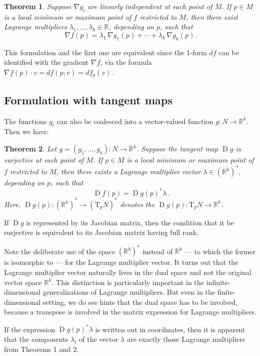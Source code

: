 \documentclass[12pt]{article}
\newcommand{\real}{\mathbb{R}}
\DeclareMathOperator{\D}{D}
\newcommand{\Tp}{\mathrm{T}_p}
\newtheorem{thm}{Theorem}
\begin{document}
\begin{thm}
Suppose $\nabla g_i$ are linearly independent 
at each point of $M$.
If $p \in M$ is a local minimum or maximum point of $f$ restricted to $M$,
then there exist Lagrange multipliers
 $\lambda_1, \dotsc, \lambda_k \in \real$, depending on $p$,
such that
\[
\nabla f(p) = \lambda_1 \, \nabla g_1(p) + \dotsb + \lambda_k \, \nabla g_k(p)\,.
\]
\end{thm}

This formulation and the first one 
are equivalent since
the 1-form $df$ can be identified with the gradient
$\nabla f$, via the formula $\nabla f(p) \cdot v = d f(p;v) = df_p(v)$.


\subsection{Formulation with tangent maps}

The functions $g_i$ can also be coalesced into a vector-valued function 
$g\colon N \to \real^k$.  Then we have:

\begin{thm}
Let $g = (g_1, \dotsc, g_k) \colon N \to \real^k$.
Suppose the tangent map $\D g $ is surjective
at each point of $M$.
If $p \in M$ is a local minimum or maximum point of $f$ restricted to $M$,
then 
there exists a Lagrange multiplier vector $\lambda \in (\real^k)^*$,
depending on $p$, such that
\[
\D f(p) = \D g(p)^* \lambda\,.
\]
Here, $\D g(p)\colon (\real^k)^* \to (\Tp N)^*$ 
denotes the  $\D g(p) \colon \Tp N \to \real^k$.
\end{thm}

If $\D g$ is represented by its Jacobian matrix,
then the condition that it be surjective is equivalent to
its Jacobian matrix having full rank.


Note the deliberate use of the space $(\real^k)^*$ instead of $\real^k$
--- to which the former is isomorphic to --- 
for the Lagrange multiplier vector.   It turns out that the
Lagrange multiplier vector naturally
lives in the dual space and not the original vector space $\real^k$.
This distinction is particularly important in the infinite-dimensional
generalizations of Lagrange multipliers.
But even in the finite-dimensional setting,
we do see hints that the dual space
has to be involved, because a transpose is involved
in the matrix expression for Lagrange multipliers.

If the expression $\D g(p)^* \lambda$ is written
out in coordinates, then it is apparent that the components $\lambda_i$
of the vector $\lambda$ are exactly those
Lagrange multipliers from Theorems 1 and 2.
\end{document}
